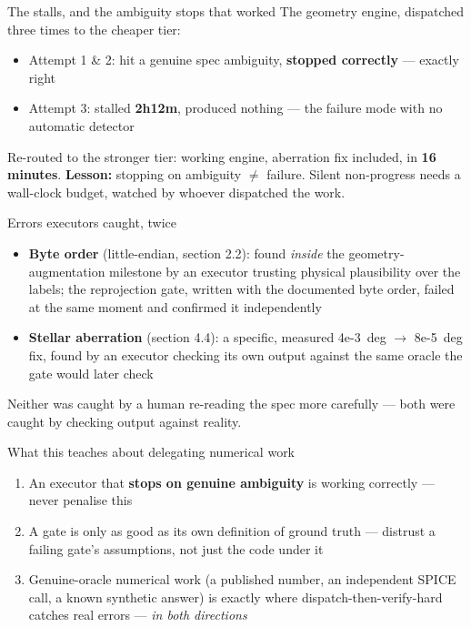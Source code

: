 \documentclass[aspectratio=169,11pt]{beamer}
\newcommand{\currevsec}{}
\newcommand{\revsec}[1]{\gdef\currevsec{#1}}
\begin{document}
\begin{frame}{The stalls, and the ambiguity stops that worked}
  \revsec{6}
  The geometry engine, dispatched three times to the cheaper tier:
  \begin{itemize}
    \item Attempt 1 \& 2: hit a genuine spec ambiguity, \textbf{stopped correctly} --- exactly right
    \item Attempt 3: stalled \textbf{2h12m}, produced nothing --- the failure mode with no automatic detector
  \end{itemize}
  Re-routed to the stronger tier: working engine, aberration fix included, in \textbf{16 minutes}.
  \vspace{0.2cm}
  \textbf{Lesson:} stopping on ambiguity $\neq$ failure. Silent non-progress needs a wall-clock budget, watched by whoever dispatched the work.
\end{frame}

\begin{frame}{Errors executors caught, twice}
  \revsec{6}
  \begin{itemize}
    \item \textbf{Byte order} (little-endian, section 2.2): found \emph{inside} the geometry-augmentation milestone by an executor trusting physical plausibility over the labels; the reprojection gate, written with the documented byte order, failed at the same moment and confirmed it independently
    \item \textbf{Stellar aberration} (section 4.4): a specific, measured 4e-3~deg $\to$ 8e-5~deg fix, found by an executor checking its own output against the same oracle the gate would later check
  \end{itemize}
  Neither was caught by a human re-reading the spec more carefully --- both were caught by checking output against reality.
\end{frame}

\begin{frame}{What this teaches about delegating numerical work}
  \revsec{6}
  \begin{enumerate}
    \item An executor that \textbf{stops on genuine ambiguity} is working correctly --- never penalise this
    \item A gate is only as good as its own definition of ground truth --- distrust a failing gate's assumptions, not just the code under it
    \item Genuine-oracle numerical work (a published number, an independent SPICE call, a known synthetic answer) is exactly where dispatch-then-verify-hard catches real errors --- \emph{in both directions}
  \end{enumerate}
\end{frame}
\end{document}
